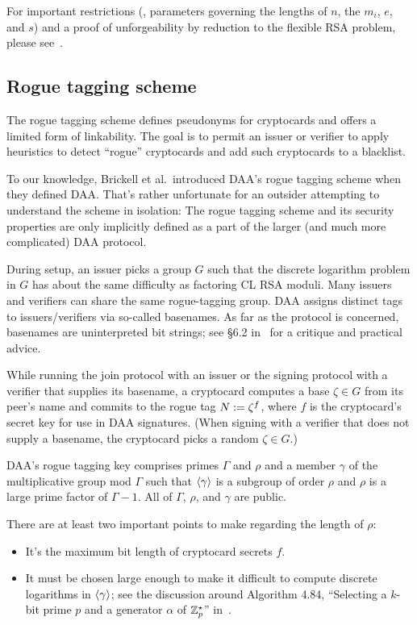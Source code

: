 For important restrictions (\ie, parameters
governing the lengths of $n$, the $m_i$, $e$, and
$s$) and a proof of unforgeability by reduction to the flexible RSA problem, please
see~\cite{cl}.

\subsection{Rogue tagging scheme}

The rogue tagging scheme defines pseudonyms for cryptocards and offers
a limited form of linkability.
The goal is to permit an issuer or verifier to apply heuristics to detect ``rogue'' cryptocards
and add such cryptocards to a blacklist.

To our knowledge, Brickell et al.\ introduced DAA's rogue tagging scheme
when they defined DAA.
That's rather unfortunate for an outsider attempting to understand the scheme in isolation:
The rogue tagging scheme and its security properties are only implicitly defined as a part of the larger (and much more complicated) DAA protocol.

During setup, an issuer picks a group $G$ such that the discrete
logarithm problem in $G$ has about the same difficulty as
factoring CL RSA moduli.
Many issuers and verifiers can share the same rogue-tagging
group. DAA assigns distinct tags to issuers/verifiers via
so-called basenames. As far as the protocol is concerned,
basenames are uninterpreted bit strings; see \S\/6.2 in~\cite{smyth}
for a critique and practical advice.

While running the join protocol with an issuer or the signing
protocol with a verifier that supplies its basename, a
cryptocard computes a base $\zeta \in G$ from its peer's name and
commits to the rogue tag $N \mathrel{:=} \zeta^f$, where $f$ is the cryptocard's
secret key for use in DAA signatures. (When signing with a
verifier that does not supply a basename, the cryptocard picks
a random $\zeta \in G$.)

\medskip

DAA's rogue tagging key comprises primes $\Gamma$ and $\rho$ and a member $\gamma$
of the multiplicative group mod $\Gamma$ such that $\langle{\gamma}\rangle$ is a subgroup of order $\rho$ and $\rho$ is a
large prime factor of $\Gamma - 1$.
All of $\Gamma$, $\rho$, and $\gamma$ are public.

There are at least two important points to make regarding the length of $\rho$:
\begin{itemize}

\item It's the maximum bit length of cryptocard secrets $f$.

\item It must be chosen large enough to make it difficult to
compute discrete logarithms in $\langle{\gamma}\rangle$; see the discussion around
Algorithm 4.84, ``Selecting a $k$-bit prime $p$ and a generator $\alpha$
of $\mathbb{Z}^{\star}_{p}$'' in~\cite{handbook}.

\end{itemize}


